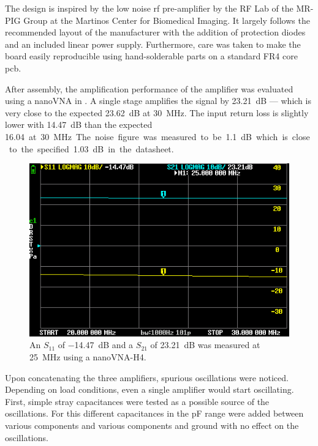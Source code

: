 The design is inspired by the low noise \acrshort{rf} pre-amplifier by the RF Lab of the MR-PIG Group at the Martinos Center for Biomedical Imaging. It largely follows the recommended layout of the manufacturer with the addition of protection diodes and an included linear power supply. Furthermore, care was taken to make the board easily reproducible using hand-solderable parts on a standard FR4 core \acrshort{pcb}.

After assembly, the amplification performance of the amplifier was evaluated using a nanoVNA in . A single stage amplifies the signal by \qty{23.21}{\deci\bel} --- which is very close to the expected \qty{23.62}{\deci\bel} at \qty{30}{\mega\hertz}. The input return loss is slightly lower with \qty{14.47}{\deci\bel} than the expected \qty{16.04} at \qty{30}{\mega\hertz}. The noise figure was measured to be \qty{1.1}{\deci\bel} which is close to the specified \qty{1.03}{\deci\bel} in the datasheet.

\begin{figure}[hbt]
    \centering
    \includegraphics[width=\textwidth]{images/preamp_20DB_25MHz.png}
    \caption{ An \(S_{11}\) of \qty{-14.47}{\deci\bel} and a \(S_21\) of \qty{23.21}{\deci\bel} was measured at \qty{25}{\mega\hertz} using a nanoVNA-H4.}
\end{figure}

Upon concatenating the three amplifiers, spurious oscillations were noticed. Depending on load conditions, even a single amplifier would start oscillating. First, simple stray capacitances were tested as a possible source of the oscillations. For this different capacitances in the \unit{\pico\farad} range were added between various components and various components and ground with no effect on the oscillations.


